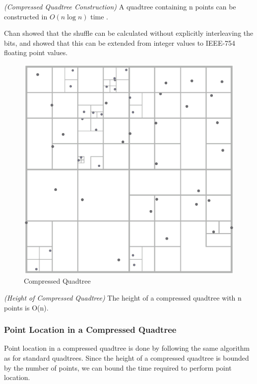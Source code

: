 \documentclass[mcs]{scsthesis}
\begin{document}
\begin{thm} \emph{(Compressed Quadtree Construction)}
A quadtree containing n points can be constructed in \(O(n \log n)\) time
\cite{bern}.
\end{thm}

Chan \cite{chan} showed that the shuffle can be calculated without explicitly
interleaving the bits, and \cite{connor} showed that this can be extended from
integer values to IEEE-754 floating point values.

\begin{figure}
\begin{center}
\includegraphics[scale=0.4]{diagrams/compressed_quadtree.eps}
\caption{Compressed Quadtree}
\end{center}
\end{figure}

\begin{thm} \emph{(Height of Compressed Quadtree)}
The height of a compressed quadtree with n points is O(n).
\end{thm}

\subsubsection{Point Location in a Compressed Quadtree}

Point location in a compressed quadtree is done by following the same algorithm
as for standard quadtrees. Since the height of a compressed quadtree is
bounded by the number of points, we can bound the time required to perform
point location.
\end{document}
